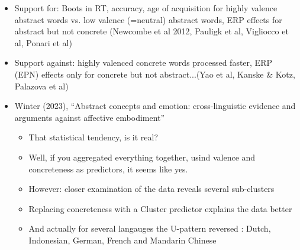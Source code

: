 \documentclass[12pt,letterpaper,table,svgnames,dvipsnames]{article}
\begin{document}
\begin{itemize}
\begin{itemize}
            \item Support for: Boots in RT, accuracy, age of acquisition for highly valence abstract words vs. low valence (=neutral) abstract words, ERP effects for abstract but not concrete (Newcombe et al 2012, Pauligk et al, Vigliocco et al, Ponari et al)

            \item Support against: highly valenced concrete words processed faster, ERP (EPN) effects only for concrete but not abstract...(Yao et al, Kanske \& Kotz, Palazova et al)
            

            \item Winter (2023), ``Abstract concepts and emotion: cross-linguistic evidence and arguments against affective embodiment''
                \begin{itemize}
                    \item That statistical tendency, is it real?

                    \item Well, if you aggregated everything together, usind valence and concreteness as predictors, it seems like yes.

                    \item However: closer examination of the data reveals several sub-clusters
                       






                    \item Replacing concreteness with a Cluster predictor explains the data better

                    \item And actually for several langauges the U-pattern reversed : Dutch, Indonesian, German, French and Mandarin Chinese


\end{itemize}
\end{itemize}
\end{itemize}
\end{document}

